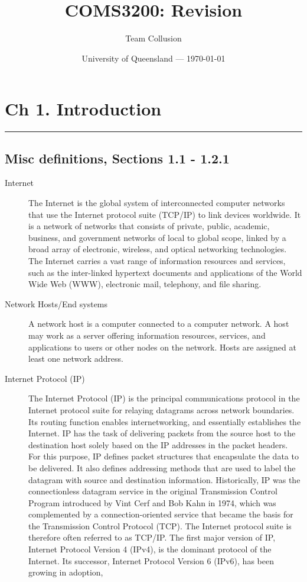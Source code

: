 \documentclass{article}
\title{COMS3200: Revision} %
\author{Team Collusion}
\date{University of Queensland --- \today}
\begin{document}
\maketitle %

\section*{Ch 1. Introduction}
\noindent
\rule{\linewidth}{0.5mm}
\noindent

\subsection*{Misc definitions, Sections 1.1 - 1.2.1}
\begin{description}
    \item[Internet] The Internet is the global system of interconnected computer networks that use the Internet protocol suite (TCP/IP) to link devices worldwide. It is a network of networks that consists of private, public, academic, business, and government networks of local to global scope, linked by a broad array of electronic, wireless, and optical networking technologies. The Internet carries a vast range of information resources and services, such as the inter-linked hypertext documents and applications of the World Wide Web (WWW), electronic mail, telephony, and file sharing.
    
    \item[Network Hosts/End systems] A network host is a computer connected to a computer network. A host may work as a server offering information resources, services, and applications to users or other nodes on the network. Hosts are assigned at least one network address.
    
    \item[Internet Protocol (IP)] The Internet Protocol (IP) is the principal communications protocol in the Internet protocol suite for relaying datagrams across network boundaries. Its routing function enables internetworking, and essentially establishes the Internet. IP has the task of delivering packets from the source host to the destination host solely based on the IP addresses in the packet headers. For this purpose, IP defines packet structures that encapsulate the data to be delivered. It also defines addressing methods that are used to label the datagram with source and destination information. Historically, IP was the connectionless datagram service in the original Transmission Control Program introduced by Vint Cerf and Bob Kahn in 1974, which was complemented by a connection-oriented service that became the basis for the Transmission Control Protocol (TCP). The Internet protocol suite is therefore often referred to as TCP/IP. The first major version of IP, Internet Protocol Version 4 (IPv4), is the dominant protocol of the Internet. Its successor, Internet Protocol Version 6 (IPv6), has been growing in adoption, 


\end{description}
\end{document}
